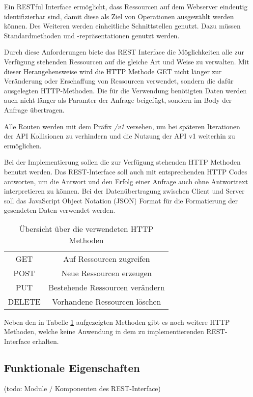 Ein RESTful Interface ermöglicht, dass Ressourcen auf dem Webserver eindeutig identifizierbar sind, damit diese als Ziel von Operationen ausgewählt werden können. Des Weiteren werden einheitliche Schnittstellen genutzt. Dazu müssen Standardmethoden und -repräsentationen genutzt werden.

Durch diese Anforderungen biete das REST Interface die Möglichkeiten alle zur Verfügung stehenden Ressourcen auf die gleiche Art und Weise zu verwalten. Mit dieser Herangehensweise wird die HTTP Methode GET nicht länger zur Veränderung oder Erschaffung von Ressourcen verwendet, sondern die dafür ausgelegten HTTP-Methoden. Die für die Verwendung benötigten Daten werden auch nicht länger als Paramter der Anfrage beigefügt, sondern im Body der Anfrage übertragen.\cite{beimsWebApplikationenREST2014}

Alle Routen werden mit dem Präfix \textit{/v1} versehen, um bei späteren Iterationen der API Kollisionen zu verhindern und die Nutzung der API v1 weiterhin zu ermöglichen. 

Bei der Implementierung sollen die zur Verfügung stehenden HTTP Methoden benutzt werden. Das REST-Interface soll auch mit entsprechenden HTTP Codes antworten, um die Antwort und den Erfolg einer Anfrage auch ohne Antworttext interpretieren zu können. Bei der Datenübertragung zwischen Client und Server soll das JavaScript Object Notation (JSON) Format für die Formatierung der gesendeten Daten verwendet werden.

\begin{table}
	\centering
	\begin{tabular}{c c}
		GET & Auf Ressourcen zugreifen \\ 
		POST & Neue Ressourcen erzeugen \\  
		PUT & Bestehende Ressourcen verändern \\
		DELETE & Vorhandene Ressourcen löschen \\
	\end{tabular}
	\caption{Übersicht über die verwendeten HTTP Methoden}
	\label{table:http-methods}
\end{table}

Neben den in Tabelle \ref{table:http-methods} aufgezeigten Methoden gibt es noch weitere HTTP Methoden, welche keine Anwendung in dem zu implementierenden REST-Interface erhalten.

\subsection{Funktionale Eigenschaften}
(todo: Module / Komponenten des REST-Interface)
